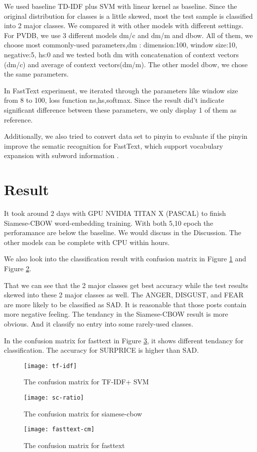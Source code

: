 We used baseline TD-IDF plus SVM with linear kernel as baseline. 
Since the original distribution for classes is a little skewed, most the test sample is classified into 2 major classes.
We compared it with other models with different settings. \\

For PVDB, we use 3 different models dm/c and dm/m and dbow. All of them, we choose most commonly-used parameters,dm : dimension:100, window size:10, negative:5, hs:0 and we tested both dm with concatenation of context vectors (dm/c) and average of context vectors(dm/m). 
The other model dbow, we chose the same parameters.

In FastText experiment, we iterated through the parameters like window size from 8 to 100, 
loss function ns,hs,softmax.  Since the result did't indicate significant difference between these parameters, 
we only display 1 of them as reference.

Additionally, we also tried to convert data set to pinyin to evaluate 
if the pinyin improve the sematic recognition for FastText, 
which support vocabulary expansion with subword information \cite{bojanowski2016enriching}. 

\section{Result}

It took around 2 days with GPU NVIDIA TITAN X (PASCAL) to finish Siamese-CBOW word-embedding training. With both 5,10 epoch the perforamance are below the baseline. 
We would discuss in the Discussion. The other models can be complete with CPU within hours.

We also look into the classification result with confusion matrix in Figure \ref{confusion1} and Figure \ref{confusion2}.

That we can see that the 2 major classes get best accuracy while the test results skewed into these 2 major classes as well.  
The ANGER, DISGUST, and FEAR are more likely to be classified as SAD. It is reasonable that those posts contain more negative feeling.
The tendancy in the Siamese-CBOW result is more obvious. And it classify no entry into some rarely-used classes.

In the confusion matrix for fasttext in Figure \ref{confusion3}, it shows different tendancy for classification. The accuracy for SURPRICE is higher than SAD.

\begin{figure}[h]
    \centering
	\texttt{[image: tf-idf]}
    \caption{The confusion matrix for TF-IDF+ SVM}
    \label{confusion1}
\end{figure}

\begin{figure}[h]
    \centering
	\texttt{[image: sc-ratio]}
    \caption{The confusion matrix for siamese-cbow}
    \label{confusion2}
\end{figure}

\begin{figure}[h]
    \centering
	\texttt{[image: fasttext-cm]}
    \caption{The confusion matrix for fasttext}
    \label{confusion3}
\end{figure}